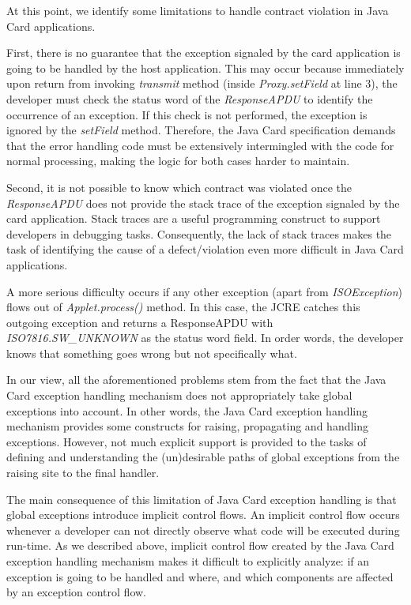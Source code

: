 \documentclass[10pt, conference, compsocconf]{IEEEtran}
\begin{document}
At this point, we identify some limitations to handle
contract violation in Java Card applications.

First, there is no guarantee that the exception signaled
by the card application is going to be handled by the host
application. This may occur because immediately upon
return from invoking \textit{transmit} method (inside
\textit{Proxy.setField} at line 3), the developer must check the
status word of the \textit{ResponseAPDU} to identify the
occurrence of an exception. If this check is not performed,
the exception is ignored by the \textit{setField} method.
Therefore, the Java Card specification demands that the
error handling code must be extensively intermingled with
the code for normal processing, making the logic for both
cases harder to maintain.

Second, it is not possible to know which contract was
violated once the \textit{ResponseAPDU} does not provide the
stack trace of the exception signaled by the card
application. Stack traces are a useful programming
construct to support developers in debugging tasks.
Consequently, the lack of stack traces makes the task of
identifying the cause of a defect/violation even more
difficult in Java Card applications.

A more serious difficulty occurs if any other
exception (apart from \textit{ISOException}) flows out of
\textit{Applet.process()} method. In this case, the JCRE catches
this outgoing exception and returns a ResponseAPDU
with \textit{ISO7816.SW\_UNKNOWN} as the status word field. In
order words, the developer knows that something goes
wrong but not specifically what. 

In our view, all the aforementioned problems stem
from the fact that the Java Card exception handling
mechanism does not appropriately take global \cite{RobillardM00}
\cite{Robillard:2003} exceptions into account. In other words, the Java Card
exception handling mechanism provides some constructs
for raising, propagating and handling exceptions.
However, not much explicit support is provided to the
tasks of defining and understanding the (un)desirable paths of global exceptions
from the raising site to the final handler. 

\begin{figure}

\end{figure}

The main consequence of this limitation of Java Card
exception handling is that global exceptions introduce
implicit control flows. An implicit control flow occurs
whenever a developer can not directly observe what code
will be executed during run-time. As we described above,
implicit control flow created by the Java Card exception
handling mechanism makes it difficult to explicitly
analyze: if an exception is going to be handled and where,
and which components are affected by an exception
control flow.
\end{document}

